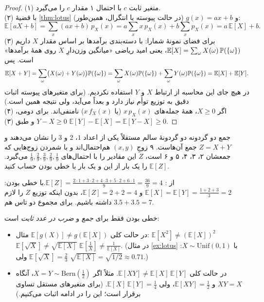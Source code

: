 \begin{proof}
  \newline (۱) متغیر ثابت $c$ با احتمال ۱ مقدار $c$ را می‌گیرد.\\
  (۲) با قضیهٔ \ref{thm:lotus} و $g(x)=ax+b$ (در حالت پیوسته با انتگرال، همین‌طور):
  \[ \mathbb E[aX+b]=\sum_x(ax+b)\,p_X(x)=a\sum_xx\,p_X(x)+b\sum_xp_X(x)=a\,\mathbb E[X]+b. \]
  (۳) برای فضای نمونهٔ شمارا: با دسته‌بندی برآمدها بر اساس مقدار $X$ داریم $\mathbb E[X]=\sum_{\omega}X(\omega)\,\P(\{\omega\})$، یعنی امید ریاضی «میانگین وزن‌دارِ $X$ روی همهٔ برآمدها» است. پس
  \[ \mathbb E[X+Y]=\sum_\omega\bigl(X(\omega)+Y(\omega)\bigr)\P(\{\omega\})=\sum_\omega X(\omega)\P(\{\omega\})+\sum_\omega Y(\omega)\P(\{\omega\})=\mathbb E[X]+\mathbb E[Y]. \]
  در هیچ جای این محاسبه از ارتباط $X$ و $Y$ استفاده نکردیم. (برای متغیرهای پیوسته اثبات دقیق به توزیع توأم نیاز دارد و بعداً می‌آید، ولی نتیجه همین است.)\\
  (۴) اگر $X\ge0$، همهٔ جمله‌های $x\,p_X(x)$ (یا $x\,f_X(x)$) نامنفی‌اند. برای دومی، $Y-X\ge0$ و طبق (۳) \newline $\mathbb E[Y]-\mathbb E[X]=\mathbb E[Y-X]\ge0$.
\end{proof}

\begin{example}[label=ex:sum-two-mean]{جمع دو گردونه}
  دو گردونهٔ سالم مستقلاً یکی از اعداد $1$، $2$ و $3$ را نشان می‌دهند و $Z=X+Y$ جمع آن‌هاست. ۹ زوجِ $(x,y)$ هم‌احتمال‌اند و با شمردن زوج‌هایی که جمعشان ۲، ۳، ۴، ۵ و ۶ است، $Z$ این مقادیر را با احتمال‌های $\tfrac19,\tfrac29,\tfrac39,\tfrac29,\tfrac19$ می‌گیرد. $\mathbb E[Z]$ را یک بار از این  و یک بار با خطی بودن حساب کنید.
  \begin{solution}
    از : $\mathbb E[Z]=\frac{2\cdot1+3\cdot2+4\cdot3+5\cdot2+6\cdot1}{9}=\frac{36}{9}=4$.\newline با خطی بودن: $\mathbb E[X]=\mathbb E[Y]=\frac{1+2+3}{3}=2$ و $\mathbb E[Z]=2+2=4$، بدون اینکه توزیع $Z$ را لازم داشته باشیم. برای مجموع دو تاس هم $3.5+3.5=7$.
  \end{solution}
\end{example}

\begin{warning}
  خطی بودن فقط برای \emph{جمع} و \emph{ضرب در عدد ثابت} است:
  \begin{itemize}
    \item در حالت کلی $\mathbb E[g(X)]\ne g(\mathbb E[X])$ \newline مثال: \quad \quad $\mathbb E[X^2]\ne(\mathbb E[X])^2$ \quad \quad $\mathbb E[\sqrt X]\ne\sqrt{\mathbb E[X]}$ \quad \quad $\mathbb E[\frac1X]\ne\frac{1}{\mathbb E[X]}$.  \newline (در مثال \ref{ex:lotus} با $X\sim\mathrm{Unif}(0,1)$: $\mathbb E[\sqrt X]=\frac23$ ولی $\sqrt{\mathbb E[X]}=\sqrt{1/2}\approx0.71$.)
    \item در حالت کلی $\mathbb E[XY]\ne\mathbb E[X]\,\mathbb E[Y]$. مثلاً اگر $X=Y\sim\mathrm{Bern}(\tfrac12)$، آنگاه $XY=X$ و $\mathbb E[XY]=\tfrac12$، ولی $\mathbb E[X]\,\mathbb E[Y]=\tfrac14$. (برای متغیرهای مستقل تساوی برقرار است؛ این را در ادامه اثبات می‌کنیم.)
  \end{itemize}
\end{warning}


